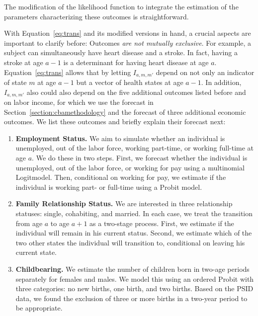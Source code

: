 The modification of the likelihood function to integrate the estimation of the parameters characterizing these outcomes is straightforward.

With Equation~\eqref{eq:trans} and its modified versions in hand, a crucial aspects are important to clarify before: Outcomes \textit{are not mutually exclusive}. For example, a subject can simultaneously have heart disease and a stroke. In fact, having a stroke at age $a-1$ is a determinant for having heart disease at age $a$. Equation~\eqref{eq:trans} allows that by letting $I_{a,m,m'}$ depend on not only an indicator of state $m$ at age $a-1$ but a vector of health states at age $a-1$. In addition, $I_{a,m,m'}$ also could also depend on the five additional outcomes listed before and on labor income, for which we use the forecast in Section~\ref{section:cbamethodology} and the forecast of three additional economic outcomes. We list these outcomes and briefly explain their forecast next:

\begin{enumerate}
\item \textbf{Employment Status.} We aim to simulate whether an individual is unemployed, out of the labor force, working part-time, or working full-time at age $a$. We do these in two steps. First, we forecast whether the individual is unemployed, out of
the labor force, or working for pay using a multinomial Logitmodel. Then, conditional on working for pay, we estimate if the individual is working part- or full-time using a Probit model.
\item \textbf{Family Relationship Status.} We are interested in three relationship statuses: single, cohabiting, and married. In each case, we treat the transition from age $a$ to age $a+1$ as a two-stage process. First, we estimate if the individual will remain in his current status. Second, we estimate which of the two other states the individual will transition to, conditional on leaving his current state.
\item \textbf{Childbearing.} We estimate the number of children born in two-age periods separately for females and males. We model this using an ordered Probit with three categories: no new births, one birth, and two births. Based on the PSID data, we found the exclusion of three or more births in a two-year period to be appropriate.
\end{enumerate}


